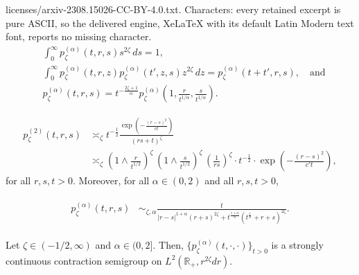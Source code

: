 \documentclass[10pt,a4paper]{amsart}
\newcommand{\R}{\mathbb{R}}
\begin{document}
licenses/arxiv-2308.15026-CC-BY-4.0.txt. Characters: every retained excerpt is pure ASCII, so the delivered engine, XeLaTeX with its default Latin Modern text font, reports no missing character.
\begin{align}
  \label{eq:normalizedalpha}
  & \int_0^\infty p_\zeta^{(\alpha)}(t,r,s) s^{2\zeta}\,ds = 1, \\
  \label{eq:chapman}
  & \int_0^\infty p_\zeta^{(\alpha)}(t,r,z) p_\zeta^{(\alpha)}(t',z,s) z^{2\zeta}\,dz = p_\zeta^{(\alpha)}(t+t',r,s), \quad \text{and} \\
  \label{eq:scalingalpha}
  & p_\zeta^{(\alpha)}(t,r,s) = t^{-\frac{2\zeta+1}{\alpha}} p_\zeta^{(\alpha)}\left(1,\frac{r}{t^{1/\alpha}},\frac{s}{t^{1/\alpha}}\right).
\end{align}

  \begin{subequations}
    \label{eq:easybounds2}
    \begin{align}
      p_\zeta^{(2)}(t,r,s)
      \label{eq:easybounds2a}
      & \asymp_\zeta t^{-\frac12}\frac{\exp\left(-\frac{(r-s)^2}{c t}\right)}{(rs+t)^{\zeta}} \\
      \label{eq:easybounds2b}
      & \asymp_\zeta \left(1\wedge\frac{r}{t^{1/2}}\right)^{\zeta}\, \left(1\wedge\frac{s}{t^{1/2}}\right)^{\zeta}\,\left(\frac{1}{rs}\right)^{\zeta} \cdot t^{-\frac12} \cdot \exp\left(-\frac{(r-s)^2}{c' t}\right),
    \end{align}
  \end{subequations}\index{$\asymp$}for all $r,s,t>0$. Moreover, for all $\alpha\in(0,2)$ and all $r,s,t>0$,

  \begin{align}
    \label{eq:heatkernelalpha1weightedsubordinatedboundsfinal}
    \begin{split}
      p_\zeta^{(\alpha)}(t,r,s)
      & \sim_{\zeta,\alpha} \frac{t}{|r-s|^{1+\alpha}(r+s)^{2\zeta} + t^{\frac{1+\alpha}{\alpha}}(t^{\frac1\alpha}+r+s)^{2\zeta}}.
    \end{split}
  \end{align}

\begin{proposition}
  \label{strongcontinuity}
  Let $\zeta\in(-1/2,\infty)$ and $\alpha\in(0,2]$.
  Then, $\{p_\zeta^{(\alpha)}(t,\cdot,\cdot)\}_{t>0}$ is a strongly continuous contraction semigroup on $L^2(\R_+,r^{2\zeta}dr)$.
\end{proposition}
\end{document}
